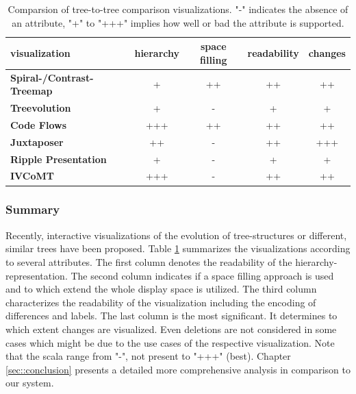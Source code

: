 
\begin{table}[tb]
\centering 
\begin{tabular}[r]{|l|c|c|c|c|} 
\hline
\textbf{visualization} & \textbf{hierarchy} & \textbf{space filling} & \textbf{readability} & \textbf{changes}\\
\hline
\hline
\textbf{Spiral-/Contrast-Treemap} & + & ++\footnotemark & ++ & ++\\
\hline
\textbf{Treevolution} & + & - & + & +\\
\hline
\textbf{Code Flows} & +++ & ++ & ++ & ++\\
\hline
\textbf{Juxtaposer} & ++ & - & ++ & +++\\
\hline
\textbf{Ripple Presentation} & + & - & + & +\\
\hline
\textbf{IVCoMT} & +++ & - & ++ & ++ \\
\hline
\end{tabular}
\label{chap2:comparsion}
\vspace{0.5em} 
\caption{Comparsion of tree-to-tree comparison visualizations. "-" indicates the absence of an attribute, "+" to "+++" implies how well or bad the attribute is supported.}
\end{table}


\subsubsection{Summary}
Recently, interactive visualizations of the evolution of tree-structures or different, similar trees have been proposed. Table \ref{chap2:comparsion} summarizes the visualizations according to several attributes. The first column denotes the readability of the hierarchy-representation. The second column indicates if a space filling approach is used and to which extend the whole display space is utilized. The third column characterizes the readability of the visualization including the encoding of differences and labels. The last column is the most significant. It determines to which extent changes are visualized. Even deletions are not considered in some cases which might be due to the use cases of the respective visualization. Note that the scala range from "-", not present to "+++" (best). Chapter \ref{sec::conclusion} presents a detailed more comprehensive analysis in comparison to our system. 

